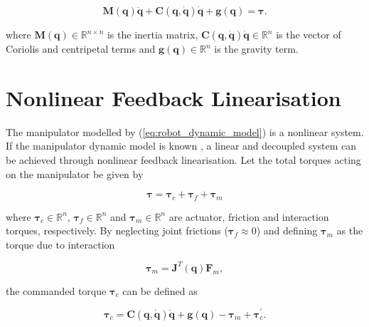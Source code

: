 \begin{equation}
    \label{eq:robot_dynamic_model}
    \boldsymbol{M}(\boldsymbol{q})\ddot{\boldsymbol{q}} + \boldsymbol{C}(\boldsymbol{q}, \dot{\boldsymbol{q}})\dot{\boldsymbol{q}} + \boldsymbol{g}(\boldsymbol{q}) = \boldsymbol{\tau}.
\end{equation}

where $\boldsymbol{M}(\boldsymbol{q}) \in \mathbb{R}^{n\times n}$
is the inertia matrix, $\boldsymbol{C}(\boldsymbol{q}, \dot{\boldsymbol{q}})\dot{\boldsymbol{q}} \in \mathbb{R}^n$
is
the vector of Coriolis and centripetal terms and $\boldsymbol{g}(\boldsymbol{q}) \in \mathbb{R}^n$
is the gravity term.


\section{Nonlinear Feedback Linearisation}
\label{sec:control_architectures_nonlinear_feedback_linearization}

The manipulator modelled by (\ref{eq:robot_dynamic_model}) is a nonlinear system. If the manipulator dynamic model is known \cite{Santos2018_computed_torque_control_robotic_assisted_tele_ecography}, a linear and decoupled
system can be achieved through nonlinear feedback linearisation. 
Let the total torques acting on the manipulator be given by

\begin{equation}
    \boldsymbol{\tau} = \boldsymbol{\tau}_c + \boldsymbol{\tau}_f + \boldsymbol{\tau}_m
\end{equation}

where $\boldsymbol{\tau}_c \in \mathbb{R}^n$, $\boldsymbol{\tau}_f \in \mathbb{R}^n$ and $\boldsymbol{\tau}_m \in \mathbb{R}^n$ are actuator, friction and interaction torques, respectively. By neglecting joint frictions
($\boldsymbol{\tau}_f \approx 0$) and defining $\boldsymbol{\tau}_m$ as the torque due to interaction

\begin{equation}
    \boldsymbol{\tau}_m = \boldsymbol{J}^T(\boldsymbol{q}) \boldsymbol{F}_m,
\end{equation}

the commanded torque $\boldsymbol{\tau}_c$ can be defined as

\begin{equation}
    \label{eq:tau_c}
    \boldsymbol{\tau}_c = \boldsymbol{C}(\boldsymbol{q}, \dot{\boldsymbol{q}})\dot{\boldsymbol{q}} + \boldsymbol{g}(\boldsymbol{q}) - \boldsymbol{\tau}_m +\boldsymbol{\tau}^\prime_c .
\end{equation}

